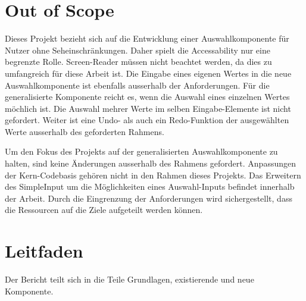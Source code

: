 \section{Out of Scope}

Dieses Projekt bezieht sich auf die Entwicklung einer Auswahlkomponente für Nutzer ohne Seheinschränkungen.
Daher spielt die Accessability nur eine begrenzte Rolle.
Screen-Reader müssen nicht beachtet werden, da dies zu umfangreich für diese Arbeit ist.
Die Eingabe eines eigenen Wertes in die neue Auswahlkomponente ist ebenfalls ausserhalb der Anforderungen.
Für die generalisierte Komponente reicht es, wenn die Auswahl eines einzelnen Wertes möchlich ist.
Die Auswahl mehrer Werte im selben Eingabe-Elemente ist nicht gefordert.
Weiter ist eine Undo- als auch ein Redo-Funktion der ausgewählten Werte ausserhalb des geforderten Rahmens. 

Um den Fokus des Projekts auf der generalisierten Auswahlkomponente zu halten, sind keine Änderungen ausserhalb des Rahmens gefordert.
Anpassungen der Kern-Codebasis gehören nicht in den Rahmen dieses Projekts.
Das Erweitern des SimpleInput um die Möglichkeiten eines Auswahl-Inputs befindet innerhalb der Arbeit.
Durch die Eingrenzung der Anforderungen wird sichergestellt, dass die Ressourcen auf die Ziele aufgeteilt werden können.


\section{Leitfaden}

Der Bericht teilt sich in die Teile Grundlagen, existierende und neue Komponente. 


